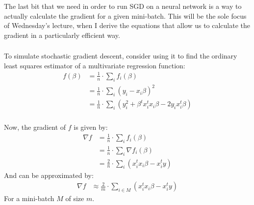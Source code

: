 \documentclass[xetex,mathserif,serif,aspectratio=169]{beamer}
\begin{document}
\begin{frame}[fragile] \frametitle{} \oldB \small


The last bit that we need in order to run SGD on a neural
network is a way to actually calculate the gradient for a
given mini-batch. This will be the sole focus of Wednesday's
lecture, when I derive the equations that allow us to calculate
the gradient in a particularly efficient way.

\end{frame}

\begin{frame}[fragile] \frametitle{} \oldB \small


To simulate stochastic gradient descent, consider using it to find the
ordinary least squares estimator of a multivariate regression function:
\begin{align*}
f(\beta) &= \frac{1}{n} \cdot \sum_i f_i(\beta) \\
&= \frac{1}{n} \cdot \sum_i (y_i - x_i \beta)^2 \\
&= \frac{1}{n} \cdot \sum_i (y_i^2 + \beta^t x_i^t x_i \beta - 2 y_i x_i^t \beta)
\end{align*}

\end{frame}

\begin{frame}[fragile] \frametitle{} \oldB \small


Now, the gradient of $f$ is given by:
\begin{align*}
\nabla f &= \frac{1}{n} \cdot \sum_i f_i(\beta) \\
&= \frac{1}{n} \cdot \sum_i  \nabla f_i(\beta) \\
&= \frac{2}{n} \cdot \sum_i  (x_i^t x_i \beta - x_i^t y)
\end{align*}
And can be approximated by:
\begin{align*}
\nabla f &\approx \frac{2}{m} \cdot \sum_{i \in M}  (x_i^t x_i \beta - x_i^t y)
\end{align*}
For a mini-batch $M$ of size $m$.

\end{frame}
\end{document}
